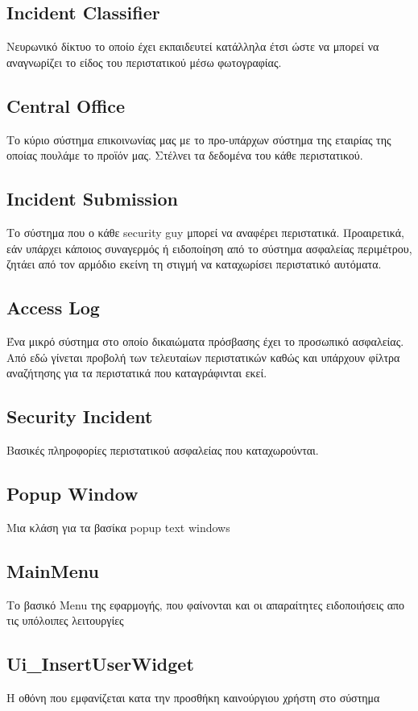 \documentclass{article}
\begin{document}
\subsection{Incident Classifier}
Νευρωνικό δίκτυο το οποίο έχει εκπαιδευτεί κατάλληλα έτσι ώστε να μπορεί να αναγνωρίζει το είδος του περιστατικού μέσω φωτογραφίας.

\subsection{Central Office}
Το κύριο σύστημα επικοινωνίας μας με το προ-υπάρχων σύστημα της εταιρίας της οποίας πουλάμε το προϊόν μας. Στέλνει τα δεδομένα του κάθε περιστατικού.

\subsection{Incident Submission}
Το σύστημα που ο κάθε security guy μπορεί να αναφέρει περιστατικά. Προαιρετικά, εάν υπάρχει κάποιος συναγερμός ή ειδοποίηση από το σύστημα ασφαλείας περιμέτρου, ζητάει από τον αρμόδιο εκείνη τη στιγμή να καταχωρίσει περιστατικό αυτόματα.

\subsection{Access Log}
Ένα μικρό σύστημα στο οποίο δικαιώματα πρόσβασης έχει το προσωπικό ασφαλείας. Από εδώ γίνεται προβολή των τελευταίων περιστατικών καθώς και υπάρχουν φίλτρα αναζήτησης για τα περιστατικά που καταγράφινται εκεί.

\subsection{Security Incident}
Βασικές πληροφορίες περιστατικού ασφαλείας που καταχωρούνται.

\subsection{Popup Window}
Μια κλάση για τα βασίκα popup text windows

\subsection{MainMenu}
Το βασικό Menu της εφαρμογής, που φαίνονται και οι απαραίτητες ειδοποιήσεις απο τις υπόλοιπες λειτουργίες

\subsection{Ui\_InsertUserWidget}
Η οθόνη που εμφανίζεται κατα την προσθήκη καινούργιου χρήστη στο σύστημα
\end{document}
